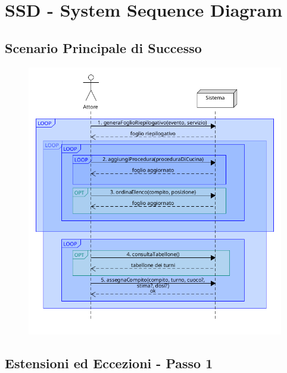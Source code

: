 \chapter{SSD - System Sequence Diagram}

\section{Scenario Principale di Successo}

\begin{figure}[h]
    \begin{center}
      \includegraphics[scale = 0.5]{images/SSD/SSD - Scenario Principale.png}
    \end{center}
\end{figure}

\section{Estensioni ed Eccezioni - Passo 1}

